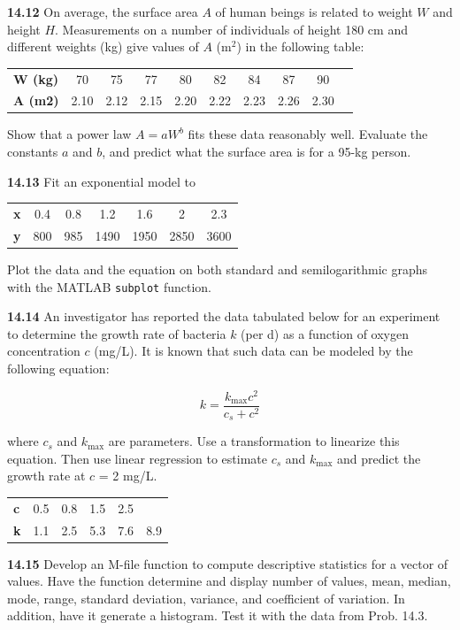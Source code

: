 \documentclass[../main.tex]{subfiles}
\begin{document}
\begin{multicols}{2}
	\noindent\textbf{14.12} On average, the surface area $A$ of human beings is
	related to weight $W$ and height $H$. Measurements on a number of individuals of height 180 cm and different weights
	(kg) give values of $A$ (m$^2$) in the following table:

	\noindent \begin{tabular}{l c c c c c c c c c}
		\textbf{W (kg)} & 70 & 75 & 77 & 80 & 82 & 84 & 87 & 90 \\
		\textbf{A (m2)} & 2.10 & 2.12 & 2.15 & 2.20 & 2.22 & 2.23 & 2.26 & 2.30 &
  	\end{tabular}

	\noindent Show that a power law $A = aW^b$ fits these data reasonably
	well. Evaluate the constants $a$ and $b$, and predict what the
	surface area is for a 95-kg person.

	\noindent\textbf{14.13} Fit an exponential model to

	\noindent \begin{tabular}{l c c c c c c }
		\textbf{x} & 0.4 & 0.8 & 1.2 & 1.6 & 2 & 2.3 \\
		\textbf{y} & 800 & 985 & 1490 & 1950 & 2850 & 3600
  	\end{tabular}

	\noindent Plot the data and the equation on both standard and semilogarithmic graphs with the MATLAB \texttt{subplot} function.

	\noindent\textbf{14.14} An investigator has reported the data tabulated below
	for an experiment to determine the growth rate of bacteria
	$k$ (per d) as a function of oxygen concentration $c$ (mg/L). It
	is known that such data can be modeled by the following
	equation:

	$$k = \frac{k_{\text{max}} c^2}{c_s + c^2}$$

	\noindent where $c_s$ and $k_{\text{max}}$ are parameters. Use a transformation to
	linearize this equation. Then use linear regression to estimate $c_s$ and $k_{\text{max}}$ and predict the growth rate at $c$ = 2 mg/L.

	\noindent \begin{tabular}{l c c c c c}
		\textbf{c} & 0.5 & 0.8 & 1.5 & 2.5 \\
		\textbf{k} & 1.1 & 2.5 & 5.3 & 7.6 & 8.9
  	\end{tabular}

	\noindent\textbf{14.15} Develop an M-file function to compute descriptive
	statistics for a vector of values. Have the function determine
	and display number of values, mean, median, mode, range,
	standard deviation, variance, and coefficient of variation. In
	addition, have it generate a histogram. Test it with the data
	from Prob. 14.3.


\end{multicols}
\end{document}
